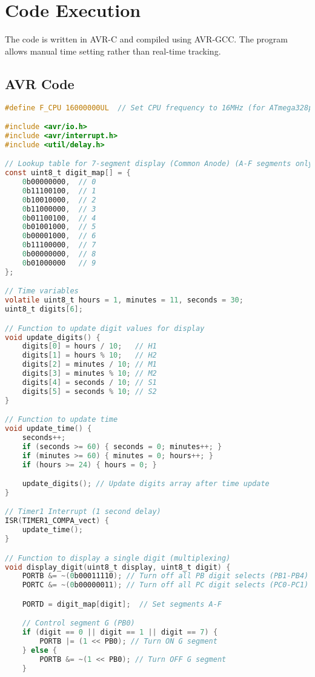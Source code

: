 \documentclass[a4paper,12pt]{article}
\begin{document}
\section{Code Execution}
The code is written in AVR-C and compiled using AVR-GCC. The program allows manual time setting rather than real-time tracking.
\subsection{AVR Code}
\begin{lstlisting}[language=C, basicstyle=\ttfamily, keywordstyle=\color{blue}, commentstyle=\color{green}]
#define F_CPU 16000000UL  // Set CPU frequency to 16MHz (for ATmega328p)

#include <avr/io.h>
#include <avr/interrupt.h>
#include <util/delay.h>

// Lookup table for 7-segment display (Common Anode) (A-F segments only)
const uint8_t digit_map[] = {
    0b00000000,  // 0
    0b11100100,  // 1
    0b10010000,  // 2
    0b11000000,  // 3
    0b01100100,  // 4
    0b01001000,  // 5
    0b00001000,  // 6
    0b11100000,  // 7
    0b00000000,  // 8
    0b01000000   // 9
};

// Time variables
volatile uint8_t hours = 1, minutes = 11, seconds = 30;
uint8_t digits[6];

// Function to update digit values for display
void update_digits() {
    digits[0] = hours / 10;   // H1
    digits[1] = hours % 10;   // H2
    digits[2] = minutes / 10; // M1
    digits[3] = minutes % 10; // M2
    digits[4] = seconds / 10; // S1
    digits[5] = seconds % 10; // S2
}

// Function to update time
void update_time() {
    seconds++;
    if (seconds >= 60) { seconds = 0; minutes++; }
    if (minutes >= 60) { minutes = 0; hours++; }
    if (hours >= 24) { hours = 0; }

    update_digits(); // Update digits array after time update
}

// Timer1 Interrupt (1 second delay)
ISR(TIMER1_COMPA_vect) {
    update_time();
}

// Function to display a single digit (multiplexing)
void display_digit(uint8_t display, uint8_t digit) {
    PORTB &= ~(0b00011110); // Turn off all PB digit selects (PB1-PB4)
    PORTC &= ~(0b00000011); // Turn off all PC digit selects (PC0-PC1)

    PORTD = digit_map[digit];  // Set segments A-F

    // Control segment G (PB0)
    if (digit == 0 || digit == 1 || digit == 7) {
        PORTB |= (1 << PB0); // Turn ON G segment
    } else {
        PORTB &= ~(1 << PB0); // Turn OFF G segment
    }


\end{lstlisting}
\end{document}
